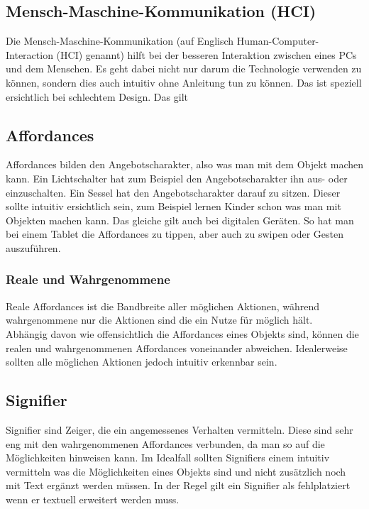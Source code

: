 \documentclass{article}
\begin{document}
\begin{itemize}
	\section{Mensch-Maschine-Kommunikation (HCI)}
	Die Mensch-Maschine-Kommunikation (auf Englisch Human-Computer-Interaction (HCI) genannt) hilft bei der besseren Interaktion zwischen eines PCs und dem Menschen. Es geht dabei nicht nur darum die Technologie verwenden zu können, sondern dies auch intuitiv ohne Anleitung tun zu können. Das ist speziell ersichtlich bei schlechtem Design. Das gilt 
	\subsection{Affordances}
	Affordances bilden den Angebotscharakter, also was man mit dem Objekt machen kann. Ein Lichtschalter hat zum Beispiel den Angebotscharakter ihn aus- oder einzuschalten. Ein Sessel hat den Angebotscharakter darauf zu sitzen. Dieser sollte intuitiv ersichtlich sein, zum Beispiel lernen Kinder schon was man mit Objekten machen kann. Das gleiche gilt auch bei digitalen Geräten. So hat man bei einem Tablet die Affordances zu tippen, aber auch zu swipen oder Gesten auszuführen.
	\subsubsection{Reale und Wahrgenommene}
	Reale Affordances ist die Bandbreite aller möglichen Aktionen, während wahrgenommene nur die Aktionen sind die ein Nutze für möglich hält. \\
	Abhängig davon wie offensichtlich die Affordances eines Objekts sind, können die realen und wahrgenommenen Affordances voneinander abweichen. Idealerweise sollten alle möglichen Aktionen jedoch intuitiv erkennbar sein.
	\subsection{Signifier}
	Signifier sind Zeiger, die ein angemessenes Verhalten vermitteln. Diese sind sehr eng mit den wahrgenommenen Affordances verbunden, da man so auf die Möglichkeiten hinweisen kann. Im Idealfall sollten Signifiers einem intuitiv vermitteln was die Möglichkeiten eines Objekts sind und nicht zusätzlich noch mit Text ergänzt werden müssen. In der Regel gilt ein Signifier als fehlplatziert wenn er textuell erweitert werden muss.

\end{itemize}
\end{document}
